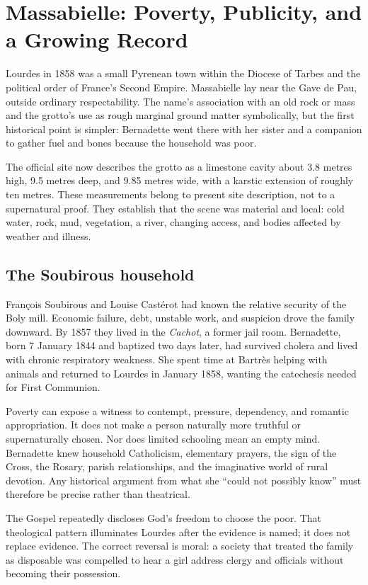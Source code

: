 \section{Massabielle: Poverty, Publicity, and a Growing Record}

Lourdes in 1858 was a small Pyrenean town within the Diocese of Tarbes and the political order of France's Second Empire. Massabielle lay near the Gave de Pau, outside ordinary respectability. The name's association with an old rock or mass and the grotto's use as rough marginal ground matter symbolically, but the first historical point is simpler: Bernadette went there with her sister and a companion to gather fuel and bones because the household was poor.

The official site now describes the grotto as a limestone cavity about 3.8 metres high, 9.5 metres deep, and 9.85 metres wide, with a karstic extension of roughly ten metres. These measurements belong to present site description, not to a supernatural proof. They establish that the scene was material and local: cold water, rock, mud, vegetation, a river, changing access, and bodies affected by weather and illness.

\subsection{The Soubirous household}

François Soubirous and Louise Castérot had known the relative security of the Boly mill. Economic failure, debt, unstable work, and suspicion drove the family downward. By 1857 they lived in the \emph{Cachot}, a former jail room. Bernadette, born 7 January 1844 and baptized two days later, had survived cholera and lived with chronic respiratory weakness. She spent time at Bartrès helping with animals and returned to Lourdes in January 1858, wanting the catechesis needed for First Communion.

Poverty can expose a witness to contempt, pressure, dependency, and romantic appropriation. It does not make a person naturally more truthful or supernaturally chosen. Nor does limited schooling mean an empty mind. Bernadette knew household Catholicism, elementary prayers, the sign of the Cross, the Rosary, parish relationships, and the imaginative world of rural devotion. Any historical argument from what she “could not possibly know” must therefore be precise rather than theatrical.

The Gospel repeatedly discloses God's freedom to choose the poor. That theological pattern illuminates Lourdes after the evidence is named; it does not replace evidence. The correct reversal is moral: a society that treated the family as disposable was compelled to hear a girl address clergy and officials without becoming their possession.

